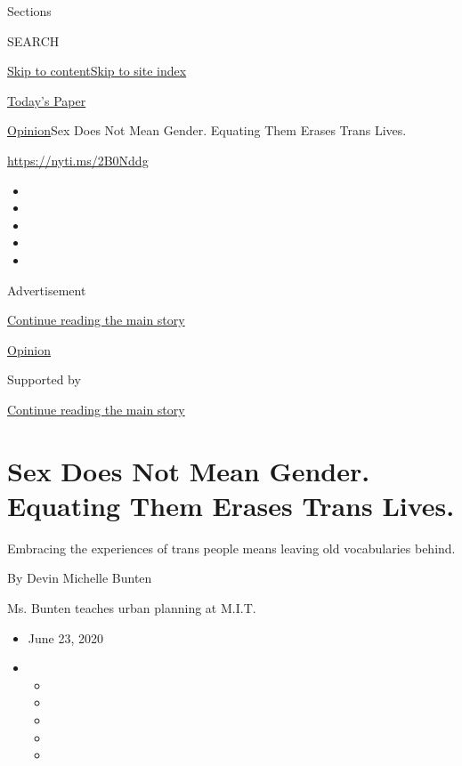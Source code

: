 Sections

SEARCH

\protect\hyperlink{site-content}{Skip to
content}\protect\hyperlink{site-index}{Skip to site index}

\href{https://myaccount.nytimes.com/auth/login?response_type=cookie\&client_id=vi}{}

\href{https://www.nytimes.com/section/todayspaper}{Today's Paper}

\href{/section/opinion}{Opinion}\textbar{}Sex Does Not Mean Gender.
Equating Them Erases Trans Lives.

\href{https://nyti.ms/2B0Nddg}{https://nyti.ms/2B0Nddg}

\begin{itemize}
\item
\item
\item
\item
\item
\end{itemize}

Advertisement

\protect\hyperlink{after-top}{Continue reading the main story}

\href{/section/opinion}{Opinion}

Supported by

\protect\hyperlink{after-sponsor}{Continue reading the main story}

\hypertarget{sex-does-not-mean-gender-equating-them-erases-trans-lives}{%
\section{Sex Does Not Mean Gender. Equating Them Erases Trans
Lives.}\label{sex-does-not-mean-gender-equating-them-erases-trans-lives}}

Embracing the experiences of trans people means leaving old vocabularies
behind.

By Devin Michelle Bunten

Ms. Bunten teaches urban planning at M.I.T.

\begin{itemize}
\item
  June 23, 2020
\item
  \begin{itemize}
  \item
  \item
  \item
  \item
  \item
  \end{itemize}
\end{itemize}

